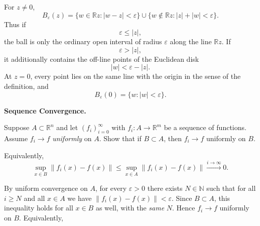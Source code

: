 \begin{solution}
For \(z\neq0\),
\[
B_\varepsilon(z)
=
\{w\in\mathbb R z:|w-z|<\varepsilon\}
\cup
\{w\notin\mathbb R z:|z|+|w|<\varepsilon\}.
\]
Thus if
\[
\varepsilon\le|z|,
\]
the ball is only the ordinary open interval of radius \(\varepsilon\) along the line
\(\mathbb R z\). If
\[
\varepsilon>|z|,
\]
it additionally contains the off-line points of the Euclidean disk
\[
|w|<\varepsilon-|z|.
\]
At \(z=0\), every point lies on the same line with the origin in the sense of the definition,
and
\[
B_\varepsilon(0)=\{w:|w|<\varepsilon\}.
\]
\end{solution}


\begin{problem}[CP-II-0562]
\label{prob:cp-ii-0562}
\textbf{Sequence Convergence.}

\hspace*{1.5em}Suppose $A\subset\mathbb{R}^n$ and let $(f_i)_{i=0}^\infty$ with $f_i:A\to\mathbb{R}^m$ be a sequence of functions.
Assume $f_i\to f$ \emph{uniformly} on $A$. Show that if $B\subset A$, then $f_i\to f$ uniformly on $B$.

\medskip Equivalently,
\[
\sup_{x\in B}\|f_i(x)-f(x)\|\le \sup_{x\in A}\|f_i(x)-f(x)\|\xrightarrow{i\to\infty} 0.
\]
\end{problem}

\begin{solution}
By uniform convergence on $A$, for every $\varepsilon>0$ there exists $N\in\mathbb{N}$ such that
for all $i\ge N$ and all $x\in A$ we have $\|f_i(x)-f(x)\|<\varepsilon$. Since $B\subset A$, this inequality holds
for all $x\in B$ as well, with the \emph{same} $N$. Hence $f_i\to f$ uniformly on $B$.  \medskip Equivalently,
\end{solution}

